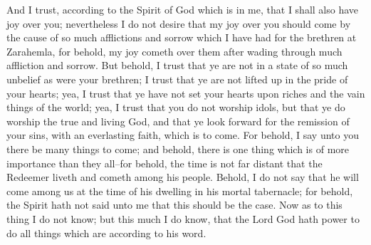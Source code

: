 And I trust, according to the Spirit of God which is in me, that I shall also have joy over you; nevertheless I do not desire that my joy over you should come by the cause of so much afflictions and sorrow which I have had for the brethren at Zarahemla, for behold, my joy cometh over them after wading through much affliction and sorrow.
\bverse \iffalse But behold, I trust that ye are not in a state of so much unbelief as were your brethren; I trust that ye are not lifted up in the pride of your hearts; yea, I trust that ye have not set your hearts upon riches and the vain things of the world; yea, I trust that you do not worship idols, but that ye do worship the true and living God, and that ye look forward for the remission of your sins, with an everlasting faith, which is to come. \fi
But behold, I trust that ye are not in a state of so much unbelief as were your brethren; I trust that ye are not lifted up in the pride of your hearts; yea, I trust that ye have not set your hearts upon riches and the vain things of the world; yea, I trust that you do not worship idols, but that ye do worship the true and living God, and that ye look forward for the remission of your sins, with an everlasting faith, which is to come.
\bverse \iffalse For behold, I say unto you there be many things to come; and behold, there is one thing which is of more importance than they all--for behold, the time is not far distant that the Redeemer liveth and cometh among his people. \fi
For behold, I say unto you there be many things to come; and behold, there is one thing which is of more importance than they all--for behold, the time is not far distant that the Redeemer liveth and cometh among his people.
\bverse \iffalse Behold, I do not say that he will come among us at the time of his dwelling in his mortal tabernacle; for behold, the Spirit hath not said unto me that this should be the case. Now as to this thing I do not know; but this much I do know, that the Lord God hath power to do all things which are according to his word. \fi
Behold, I do not say that he will come among us at the time of his dwelling in his mortal tabernacle; for behold, the Spirit hath not said unto me that this should be the case. Now as to this thing I do not know; but this much I do know, that the Lord God hath power to do all things which are according to his word.
\bverse \iffalse But behold, the Spirit hath said this much unto me, saying: Cry unto this people, saying--Repent ye, and prepare the way of the Lord, and walk in his paths, which are straight; for behold, the kingdom of heaven is at hand, and the Son of God cometh upon the face of the earth. \fi
